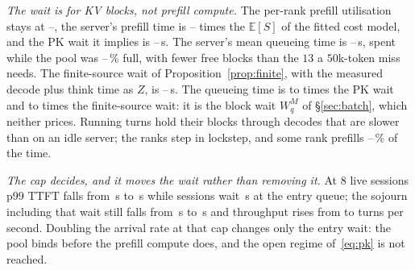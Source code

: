 \documentclass{article}
\theoremstyle{plain}
\theoremstyle{definition}
\theoremstyle{remark}
\newcommand{\E}{\mathbb{E}}
\begin{document}
\emph{The wait is for KV blocks, not prefill compute.} The per-rank
prefill utilisation stays at \eTwoRhoRankLo--\eTwoRhoRankHi, the server's
prefill time is \eTwoPfOverEsLo--\eTwoPfOverEsHi{} times the $\E[S]$
of the fitted cost model, and the PK wait it implies is
\eTwoPkLo--\eTwoPkHi\,s. The server's mean queueing time is
\eTwoWqLo--\eTwoWqHi\,s, spent while the pool was
\eTwoKvWaitLo--\eTwoKvWaitHi\,\% full, with fewer free blocks than the
$13$ a $50$k-token miss needs. The finite-source wait of
Proposition~\ref{prop:finite}, with the measured decode plus think time
as $Z$, is \eTwoFinLo--\eTwoFinHi\,s. The queueing time is
\eTwoWqOverPkLo{} to \eTwoWqOverPkHi{} times the PK wait and
\eTwoWqOverFinLo{} to \eTwoWqOverFinHi{} times the finite-source wait:
it is the block wait $W_q^M$ of \S\ref{sec:batch}, which neither
prices. Running turns hold their blocks through decodes that are
slower than on an idle server; the ranks step in lockstep, and some
rank prefills \eTwoAnyPfLo--\eTwoAnyPfHi\,\% of the time.

\emph{The cap decides, and it moves the wait rather than removing it.}
At $8$ live sessions p99 TTFT falls from \eTwoTailHi\,s to
\eTwoTailLo\,s while sessions wait \eTwoDoorHi\,s at the entry queue;
the sojourn including that wait still falls from \eTwoSojournHi\,s to
\eTwoSojournLo\,s and throughput rises from \eTwoLamLo{} to
\eTwoLamHi{} turns per second. Doubling the arrival rate at that cap
changes only the entry wait: the pool binds before the prefill compute
does, and the open regime of~\eqref{eq:pk} is not reached.
\end{document}
